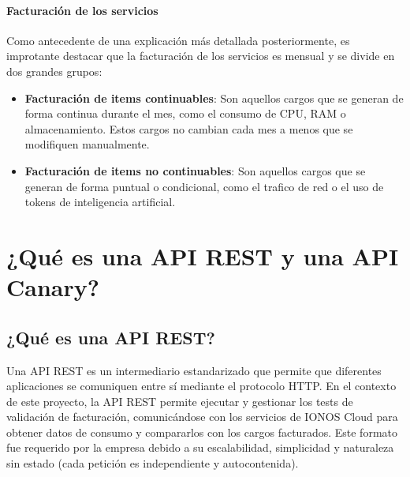 \paragraph{Facturación de los servicios}
Como antecedente de una explicación más detallada posteriormente, es improtante destacar que la facturación de los servicios es mensual y se divide en dos grandes grupos:
\begin{itemize}
    \item \textbf{Facturación de items continuables}: Son aquellos cargos que se generan de forma continua durante el mes, como el consumo de CPU, RAM o almacenamiento. Estos cargos no cambian cada mes a menos que se modifiquen manualmente.
    \item \textbf{Facturación de items no continuables}: Son aquellos cargos que se generan de forma puntual o condicional, como el trafico de red o el uso de tokens de inteligencia artificial.    
\end{itemize}

\section{¿Qué es una API REST y una API Canary?}\label{sec:api-canary}

\subsection{¿Qué es una API REST?}
Una API REST es un intermediario estandarizado que permite que diferentes aplicaciones se comuniquen entre sí mediante el protocolo HTTP.
En el contexto de este proyecto, la API REST permite ejecutar y gestionar los tests de validación de facturación, comunicándose
con los servicios de IONOS Cloud para obtener datos de consumo y compararlos con los cargos facturados. Este formato fue requerido por la empresa debido a
su escalabilidad, simplicidad y naturaleza sin estado (cada petición es independiente y autocontenida).
